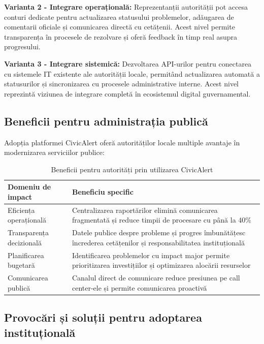 \documentclass[12pt,a4paper]{report}
\begin{document}
\textbf{Varianta 2 - Integrare operațională:} Reprezentanții autorității pot accesa conturi dedicate pentru actualizarea statusului problemelor, adăugarea de comentarii oficiale și comunicarea directă cu cetățenii. Acest nivel permite transparența în procesele de rezolvare și oferă feedback în timp real asupra progresului.

\textbf{Varianta 3 - Integrare sistemică:} Dezvoltarea API-urilor pentru conectarea cu sistemele IT existente ale autorității locale, permitând actualizarea automată a statusurilor și sincronizarea cu procesele administrative interne. Acest nivel reprezintă viziunea de integrare completă în ecosistemul digital guvernamental.

\subsection{Beneficii pentru administrația publică}

Adopția platformei CivicAlert oferă autorităților locale multiple avantaje în modernizarea serviciilor publice:

\begin{table}[H]
\centering
\caption{Beneficii pentru autorități prin utilizarea CivicAlert}
\label{tab:beneficii_autoritati}
\begin{tabular}{|p{5cm}|p{8cm}|}
\hline
\textbf{Domeniu de impact} & \textbf{Beneficiu specific} \\
\hline
Eficiența operațională & Centralizarea raportărilor elimină comunicarea fragmentată și reduce timpii de procesare cu până la 40\% \\
\hline
Transparența decizională & Datele publice despre probleme și progres îmbunătățesc încrederea cetățenilor și responsabilitatea instituțională \\
\hline
Planificarea bugetară & Identificarea problemelor cu impact major permite prioritizarea investițiilor și optimizarea alocării resurselor \\
\hline
Comunicarea publică & Canalul direct de comunicare reduce presiunea pe call center-ele și permite comunicarea proactivă \\
\hline
\end{tabular}
\end{table}

\subsection{Provocări și soluții pentru adoptarea instituțională}
\end{document}
